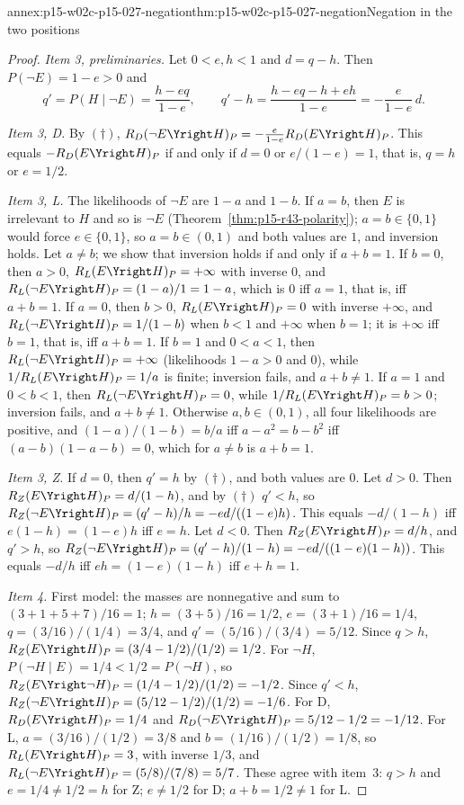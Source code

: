 \begin{annexitem}{annex:p15-w02c-p15-027-negation}{thm:p15-w02c-p15-027-negation}{Negation in the two positions}
\begin{proof}
\emph{Item 3, preliminaries.} Let \(0<e,h<1\) and \(d=q-h\). Then
\(P(\neg E)=1-e>0\) and
\[
 q'=P(H\mid\neg E)=\frac{h-eq}{1-e},\qquad
 q'-h=\frac{h-eq-h+eh}{1-e}=-\frac{e}{1-e}\,d .
 \tag{\(\dagger\)}
\]

\emph{Item 3, D.} By \((\dagger)\),
\(R_D(\neg E\Yright H)_P=-\frac{e}{1-e}R_D(E\Yright H)_P\). This equals
\(-R_D(E\Yright H)_P\) if and only if \(d=0\) or \(e/(1-e)=1\), that is,
\(q=h\) or \(e=1/2\).

\emph{Item 3, L.} The likelihoods of \(\neg E\) are \(1-a\) and \(1-b\).
If \(a=b\), then \(E\) is irrelevant to \(H\) and so is \(\neg E\)
(Theorem~\ref{thm:p15-r43-polarity}); \(a=b\in\{0,1\}\) would force
\(e\in\{0,1\}\), so \(a=b\in(0,1)\) and both values are \(1\), and
inversion holds. Let \(a\ne b\); we show that inversion holds if and
only if \(a+b=1\).
If \(b=0\), then \(a>0\), \(R_L(E\Yright H)_P=+\infty\) with inverse
\(0\), and \(R_L(\neg E\Yright H)_P=(1-a)/1=1-a\), which is \(0\) iff
\(a=1\), that is, iff \(a+b=1\).
If \(a=0\), then \(b>0\), \(R_L(E\Yright H)_P=0\) with inverse
\(+\infty\), and \(R_L(\neg E\Yright H)_P=1/(1-b)\) when \(b<1\) and
\(+\infty\) when \(b=1\); it is \(+\infty\) iff \(b=1\), that is, iff
\(a+b=1\).
If \(b=1\) and \(0<a<1\), then \(R_L(\neg E\Yright H)_P=+\infty\)
(likelihoods \(1-a>0\) and \(0\)), while
\(1/R_L(E\Yright H)_P=1/a\) is finite; inversion fails, and
\(a+b\ne1\).
If \(a=1\) and \(0<b<1\), then \(R_L(\neg E\Yright H)_P=0\), while
\(1/R_L(E\Yright H)_P=b>0\); inversion fails, and \(a+b\ne1\).
Otherwise \(a,b\in(0,1)\), all four likelihoods are positive, and
\((1-a)/(1-b)=b/a\) iff \(a-a^2=b-b^2\) iff \((a-b)(1-a-b)=0\), which
for \(a\ne b\) is \(a+b=1\).

\emph{Item 3, Z.} If \(d=0\), then \(q'=h\) by \((\dagger)\), and both
values are \(0\). Let \(d>0\). Then \(R_Z(E\Yright H)_P=d/(1-h)\), and
by \((\dagger)\) \(q'<h\), so
\(R_Z(\neg E\Yright H)_P=(q'-h)/h=-ed/((1-e)h)\). This equals
\(-d/(1-h)\) iff \(e(1-h)=(1-e)h\) iff \(e=h\). Let \(d<0\). Then
\(R_Z(E\Yright H)_P=d/h\), and \(q'>h\), so
\(R_Z(\neg E\Yright H)_P=(q'-h)/(1-h)=-ed/((1-e)(1-h))\). This equals
\(-d/h\) iff \(eh=(1-e)(1-h)\) iff \(e+h=1\).

\emph{Item 4.} First model: the masses are nonnegative and sum to
\((3+1+5+7)/16=1\); \(h=(3+5)/16=1/2\), \(e=(3+1)/16=1/4\),
\(q=(3/16)/(1/4)=3/4\), and \(q'=(5/16)/(3/4)=5/12\). Since \(q>h\),
\(R_Z(E\Yright H)_P=(3/4-1/2)/(1/2)=1/2\). For \(\neg H\),
\(P(\neg H\mid E)=1/4<1/2=P(\neg H)\), so
\(R_Z(E\Yright\neg H)_P=(1/4-1/2)/(1/2)=-1/2\). Since \(q'<h\),
\(R_Z(\neg E\Yright H)_P=(5/12-1/2)/(1/2)=-1/6\). For D,
\(R_D(E\Yright H)_P=1/4\) and \(R_D(\neg E\Yright H)_P=5/12-1/2=-1/12\).
For L, \(a=(3/16)/(1/2)=3/8\) and \(b=(1/16)/(1/2)=1/8\), so
\(R_L(E\Yright H)_P=3\), with inverse \(1/3\), and
\(R_L(\neg E\Yright H)_P=(5/8)/(7/8)=5/7\). These agree with item~3:
\(q>h\) and \(e=1/4\ne1/2=h\) for Z; \(e\ne1/2\) for D;
\(a+b=1/2\ne1\) for L.


\end{proof}
\end{annexitem}
